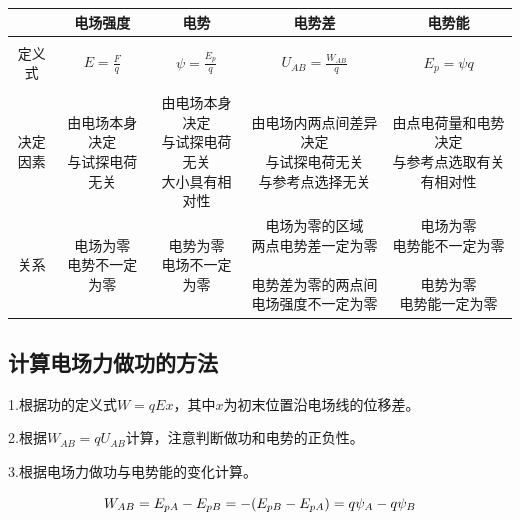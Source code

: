 \documentclass{ctexart}
\begin{document}
\begin{table}[h]
    \centering
    \begin{tabular}{c|c|c|c|c}
        \hline
         & 电场强度 & 电势 & 电势差 & 电势能 \\
        \hline
         & & & &\\
        定义式 & $E=\frac{F}{q}$ & $\psi=\frac{E_{p}}{q}$ & $U_{AB}=\frac{W_{AB}}{q}$ & $E_{p}=\psi q$\\
         & & & &\\
        \hline
        \makecell{决定\\因素} & \makecell{由电场本身决定\\与试探电荷无关} & \makecell{由电场本身决定\\与试探电荷无关\\大小具有相对性} & \makecell{由电场内两点间差异决定\\与试探电荷无关\\与参考点选择无关} & \makecell{由点电荷量和电势决定\\与参考点选取有关\\有相对性}\\
        \hline
        关系 & \makecell{电场为零\\电势不一定为零} & \makecell{电势为零\\电场不一定为零} & \makecell{电场为零的区域\\两点电势差一定为零\\\,\\电势差为零的两点间\\电场强度不一定为零} & \makecell{电场为零\\电势能不一定为零\\\,\\电势为零\\电势能一定为零}\\
        \hline
    \end{tabular}
\end{table}

\subsection{计算电场力做功的方法}

1.根据功的定义式$W=qEx$，其中$x$为初末位置沿电场线的位移差。

2.根据$W_{AB}=qU_{AB}$计算，注意判断做功和电势的正负性。

3.根据电场力做功与电势能的变化计算。

\begin{equation*}
    \centering
    W_{AB}=E_{pA}-E_{pB}=-(E_{pB}-E_{pA})=q\psi_{A}-q\psi_{B}
\end{equation*}
\end{document}
